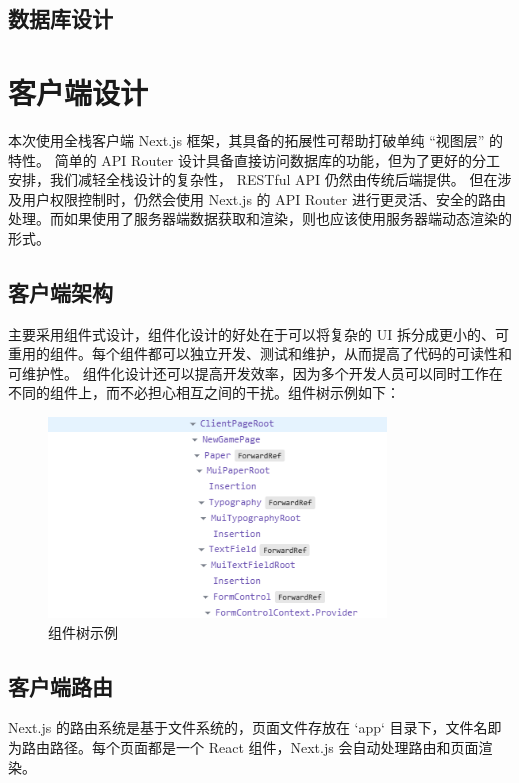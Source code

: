 \documentclass[12pt]{ctexart} %
\begin{document}
\subsection{数据库设计}


\section{客户端设计}

本次使用全栈客户端 Next.js 框架，其具备的拓展性可帮助打破单纯 “视图层” 的特性。
简单的 API Router 设计具备直接访问数据库的功能，但为了更好的分工安排，我们减轻全栈设计的复杂性， RESTful API 仍然由传统后端提供。
但在涉及用户权限控制时，仍然会使用 Next.js 的 API Router 进行更灵活、安全的路由处理。而如果使用了服务器端数据获取和渲染，则也应该使用服务器端动态渲染的形式。

\subsection{客户端架构}

主要采用组件式设计，组件化设计的好处在于可以将复杂的 UI 拆分成更小的、可重用的组件。每个组件都可以独立开发、测试和维护，从而提高了代码的可读性和可维护性。
组件化设计还可以提高开发效率，因为多个开发人员可以同时工作在不同的组件上，而不必担心相互之间的干扰。组件树示例如下：

\begin{figure}[H]
  \centering
  \includegraphics[width=0.8\textwidth]{Client-tree.png}
  \caption{组件树示例}
\end{figure}

\subsection{客户端路由}

Next.js 的路由系统是基于文件系统的，页面文件存放在 `app` 目录下，文件名即为路由路径。每个页面都是一个 React 组件，Next.js 会自动处理路由和页面渲染。
\end{document}
